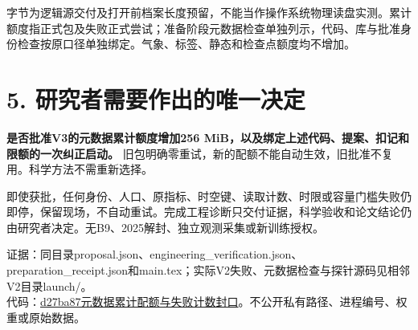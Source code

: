 \documentclass[UTF8,a4paper,10pt,fontset=none]{ctexart}
\newcommand{\key}[1]{\textcolor{ink}{\textbf{#1}}}
\begin{document}
字节为逻辑源交付及打开前档案长度预留，不能当作操作系统物理读盘实测。累计额度指正式包及失败正式尝试；准备阶段元数据检查单独列示，代码、库与批准身份检查按原口径单独绑定。气象、标签、静态和检查点额度均不增加。

\section*{5. 研究者需要作出的唯一决定}
\key{是否批准V3的元数据累计额度增加256 MiB，以及绑定上述代码、提案、扣记和限额的一次纠正启动。}
旧包明确零重试，新的配额不能自动生效，旧批准不复用。科学方法不需重新选择。

即使获批，任何身份、人口、原指标、时空键、读取计数、时限或容量门槛失败仍即停，保留现场，不自动重试。完成工程诊断只交付证据，科学验收和论文结论仍由研究者决定。无B9、2025解封、独立观测采集或新训练授权。

{\footnotesize
证据：同目录proposal.json、engineering\_verification.json、preparation\_receipt.json和main.tex；实际V2失败、元数据检查与探针源码见相邻V2目录launch/。\\
代码：\href{https://github.com/flyeagle-cex/YunTAPR-Net/commit/d27ba876ae0f1341eec7570956d20cec7cfc9bed}{d27ba87元数据累计配额与失败计数封口}。不公开私有路径、进程编号、权重或原始数据。}
\end{document}
